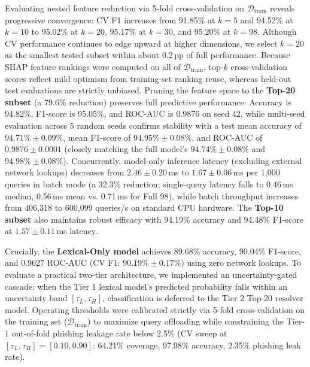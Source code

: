 Evaluating nested feature reduction via 5-fold cross-validation on $\mathcal{D}_{\text{train}}$ reveals progressive convergence: CV F1 increases from 91.85\% at $k=5$ and 94.52\% at $k=10$ to 95.02\% at $k=20$, 95.17\% at $k=30$, and 95.20\% at $k=98$. Although CV performance continues to edge upward at higher dimensions, we select $k=20$ as the smallest tested subset within about 0.2\,pp of full performance. Because SHAP feature rankings were computed on all of $\mathcal{D}_{\text{train}}$, top-$k$ cross-validation scores reflect mild optimism from training-set ranking reuse, whereas held-out test evaluations are strictly unbiased. Pruning the feature space to the \textbf{Top-20 subset} (a 79.6\% reduction) preserves full predictive performance: Accuracy is 94.82\%, F1-score is 95.05\%, and ROC-AUC is 0.9876 on seed 42, while multi-seed evaluation across 5 random seeds confirms stability with a test mean accuracy of $94.71\% \pm 0.09\%$, mean F1-score of $94.95\% \pm 0.08\%$, and ROC-AUC of $0.9876 \pm 0.0001$ (closely matching the full model's $94.74\% \pm 0.08\%$ and $94.98\% \pm 0.08\%$). Concurrently, model-only inference latency (excluding external network lookups) decreases from $2.46 \pm 0.20$\,ms to $1.67 \pm 0.06$\,ms per 1,000 queries in batch mode (a 32.3\% reduction; single-query latency falls to 0.46\,ms median, 0.56\,ms mean vs. 0.71\,ms for Full 98), while batch throughput increases from 406,318 to 600,099 queries/s on standard CPU hardware. The \textbf{Top-10 subset} also maintains robust efficacy with 94.19\% accuracy and 94.48\% F1-score at $1.57 \pm 0.11$\,ms latency.

Crucially, the \textbf{Lexical-Only model} achieves 89.68\% accuracy, 90.04\% F1-score, and 0.9627 ROC-AUC (CV F1: $90.19\% \pm 0.17\%$) using zero network lookups. To evaluate a practical two-tier architecture, we implemented an uncertainty-gated cascade: when the Tier 1 lexical model's predicted probability falls within an uncertainty band $[\tau_L, \tau_H]$, classification is deferred to the Tier 2 Top-20 resolver model. Operating thresholds were calibrated strictly via 5-fold cross-validation on the training set ($\mathcal{D}_{\text{train}}$) to maximize query offloading while constraining the Tier-1 out-of-fold phishing leakage rate below 2.5\% (CV sweep at $[\tau_L, \tau_H] = [0.10, 0.90]$: 64.21\% coverage, 97.98\% accuracy, 2.35\% phishing leak rate).

